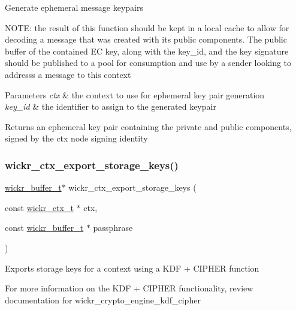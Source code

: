 Generate ephemeral message keypairs

N\+O\+TE\+: the result of this function should be kept in a local cache to allow for decoding a message that was created with it\textquotesingle{}s public components. The public buffer of the contained EC key, along with the key\+\_\+id, and the key signature should be published to a pool for consumption and use by a sender looking to addresss a message to this context


\begin{DoxyParams}{Parameters}
{\em ctx} & the context to use for ephemeral key pair generation \\
\hline
{\em key\+\_\+id} & the identifier to assign to the generated keypair \\
\hline
\end{DoxyParams}
\begin{DoxyReturn}{Returns}
an ephemeral key pair containing the private and public components, signed by the ctx node signing identity 
\end{DoxyReturn}
\mbox{\label{group__wickr__ctx_ga67e64bed3fc0a8ee550c0fc24d44c787}} 
\subsubsection{\texorpdfstring{wickr\+\_\+ctx\+\_\+export\+\_\+storage\+\_\+keys()}{wickr\_ctx\_export\_storage\_keys()}}
{\footnotesize\ttfamily \hyperlink{structwickr__buffer}{wickr\+\_\+buffer\+\_\+t}$\ast$ wickr\+\_\+ctx\+\_\+export\+\_\+storage\+\_\+keys (\begin{DoxyParamCaption}\item[{const \hyperlink{structwickr__ctx}{wickr\+\_\+ctx\+\_\+t} $\ast$}]{ctx,  }\item[{const \hyperlink{structwickr__buffer}{wickr\+\_\+buffer\+\_\+t} $\ast$}]{passphrase }\end{DoxyParamCaption})}

Exports storage keys for a context using a K\+DF + C\+I\+P\+H\+ER function

For more information on the K\+DF + C\+I\+P\+H\+ER functionality, review documentation for \textquotesingle{}wickr\+\_\+crypto\+\_\+engine\+\_\+kdf\+\_\+cipher\textquotesingle{}

